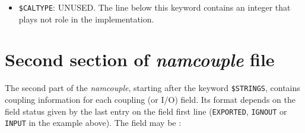 \begin{itemize}
\item {\tt \$CALTYPE}: UNUSED.  The line below this keyword contains
an integer that plays not role in the implementation.

\end{itemize}


\section{Second section of {\it namcouple} file }
\label{subsec_namcouplesecond}

The second part of the {\it namcouple}, starting after the keyword
{\tt \$STRINGS}, contains coupling information for each coupling (or
I/O) field.  Its format depends on the field status given by the last
entry on the field first line ({\tt EXPORTED}, {\tt IGNOUT} or {\tt
INPUT} in the example above). The field may be :

